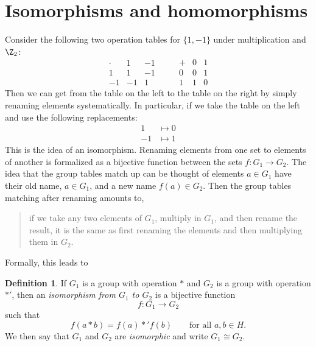 \documentclass[12pt]{amsart}
\theoremstyle{plain}
\theoremstyle{definition}
\newtheorem{defn}[thm]{Definition}
\theoremstyle{remark}
\begin{document}




\section{Isomorphisms and homomorphisms}

Consider the following two operation tables for $\{1,-1\}$ under
multiplication and $\Z_2$:
\[
\begin{array}{c||c|c}
\cdot & 1 & -1 \\ \hline\hline
1 & 1 & -1 \\ \hline
-1 & -1 & 1
\end{array}
\qquad
\begin{array}{c||c|c}
+ & 0 & 1 \\\hline\hline
0 & 0 & 1 \\ \hline
1 & 1 & 0
\end{array}
\]
Then we can get from the table on the left to the table on
the right by simply renaming elements systematically.  In
particular, if we take the table on the left and use the
following replacements:
\begin{align*}
1 &\mapsto 0\\
-1 &\mapsto 1
\end{align*}
This is the idea of an isomorphism.  Renaming elements from one set
to elements of another is formalized as a bijective function between
the sets $f:G_1\to G_2$.  
The idea that the group tables match up can be thought of elements
$a\in G_1$ have their old name, $a\in G_1$, and a new name 
$f(a)\in G_2$.  Then the group tables matching after renaming amounts
to, 
\begin{quote}
if we take any two elements of $G_1$, multiply in $G_1$, and then rename
the result, it is the same as first renaming the elements and then
multiplying them in $G_2$.
\end{quote}
Formally, this leads to
\begin{defn}
  If $G_1$ is a group with operation $*$ and $G_2$ is a group with
  operation $*'$, then an \emph{isomorphism from $G_1$ to $G_2$} is a
  bijective function
  \[ f:G_1\to G_2\]
  such that
  \[ f(a*b)  = f(a)*'f(b)\qquad\text{for all $a,b\in H$.}\]
  We then say that $G_1$ and $G_2$ are \emph{isomorphic} and write
  $G_1\cong G_2$.
\end{defn}
\end{document}
